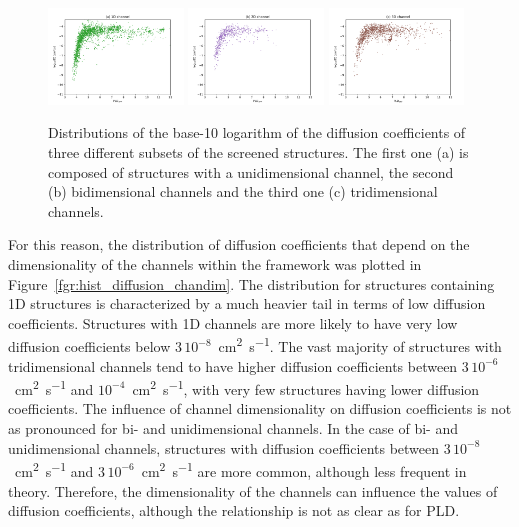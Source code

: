 \documentclass[main]{subfiles}
\begin{document}
\begin{figure}[ht]
  \centering
    \includegraphics[width=0.32\textwidth]{figures/5-diffusion/D_log-PLD_1D_chan.pdf}
    \includegraphics[width=0.32\textwidth]{figures/5-diffusion/D_log-PLD_2D_chan.pdf}
    \includegraphics[width=0.32\textwidth]{figures/5-diffusion/D_log-PLD_3D_chan.pdf}
    \caption{ Distributions of the base-10 logarithm of the diffusion coefficients of three different subsets of the screened structures. The first one (a) is composed of structures with a unidimensional channel, the second (b) bidimensional channels and the third one (c) tridimensional channels. }\label{fgr:scatter_diffusion_chandim}
\end{figure}

For this reason, the distribution of diffusion coefficients that depend on the dimensionality of the channels within the framework was plotted in Figure~\ref{fgr:hist_diffusion_chandim}. The distribution for structures containing 1D structures is characterized by a much heavier tail in terms of low diffusion coefficients. Structures with 1D channels are more likely to have very low diffusion coefficients below $3\,10^{-8}$~\si{\square\cm\per\s}. The vast majority of structures with tridimensional channels tend to have higher diffusion coefficients between $3\,10^{-6}$~\si{\square\cm\per\s} and $10^{-4}$~\si{\square\cm\per\s}, with very few structures having lower diffusion coefficients. The influence of channel dimensionality on diffusion coefficients is not as pronounced for bi- and unidimensional channels. In the case of bi- and unidimensional channels, structures with diffusion coefficients between $3\,10^{-8}$~\si{\square\cm\per\s} and $3\,10^{-6}$~\si{\square\cm\per\s} are more common, although less frequent in theory. Therefore, the dimensionality of the channels can influence the values of diffusion coefficients, although the relationship is not as clear as for PLD.
\end{document}
